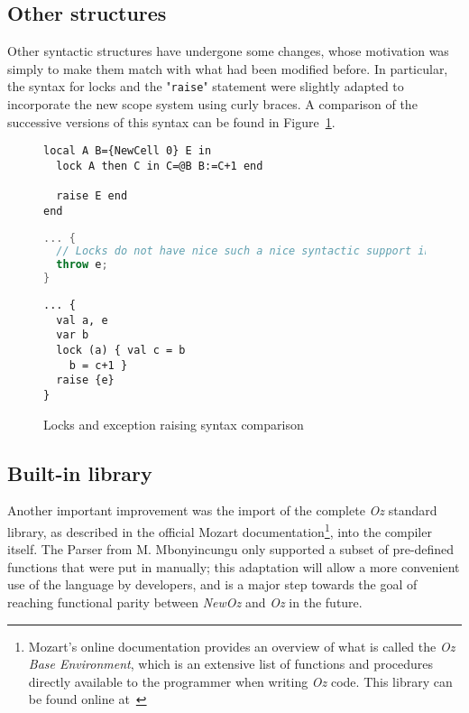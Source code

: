 \subsection{Other structures}
Other syntactic structures have undergone some changes, whose motivation was simply to make them match with what had been modified before.
In particular, the syntax for locks and the "\texttt{raise}" statement were slightly adapted to incorporate the new scope system using curly braces.\newline
A comparison of the successive versions of this syntax can be found in Figure~\ref{fig:code-comp-other}.
\begin{figure}
    \noindent\begin{minipage}{.49\textwidth}
\begin{lstlisting}[title={Oz},language=oz]
local A B={NewCell 0} E in
  lock A then C in C=@B B:=C+1 end

  raise E end
end
\end{lstlisting}
    \end{minipage}
    \hfill
    \noindent\begin{minipage}{.49\textwidth}
\begin{lstlisting}[title={Ozma},language=scala]
... {
  // Locks do not have nice such a nice syntactic support in Scala
  throw e;
}
\end{lstlisting}
    \end{minipage}
    \begin{center}
    \noindent\begin{minipage}{.89\textwidth}
\begin{lstlisting}[title={NewOz 2020/2021},language=newoz]
... {
  val a, e
  var b
  lock (a) { val c = b
    b = c+1 }
  raise {e}
}
\end{lstlisting}
    \end{minipage}
    \end{center}
\caption{Locks and exception raising syntax comparison}
\label{fig:code-comp-other}
\end{figure}

\subsection{Built-in library}
Another important improvement was the import of the complete \textit{Oz} standard library, as described in the official Mozart documentation\footnote{Mozart's online documentation provides an overview of what is called the \textit{Oz Base Environment}, which is an extensive list of functions and procedures directly available to the programmer when writing \textit{Oz} code. This library can be found online at~\cite{mozart2doc}}, into the compiler itself.
The Parser from M. Mbonyincungu only supported a subset of pre-defined functions that were put in manually;
this adaptation will allow a more convenient use of the language by developers, and is a major step towards the goal of reaching functional parity between \textit{NewOz} and \textit{Oz} in the future.

